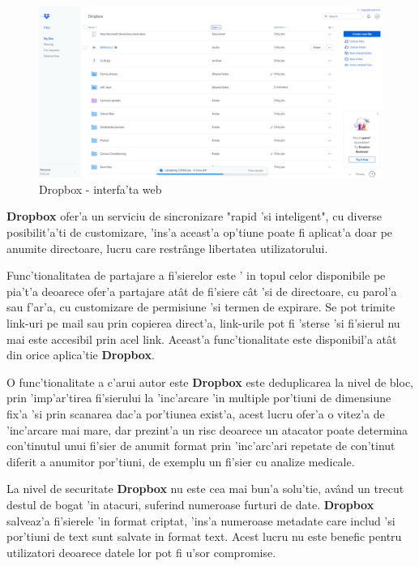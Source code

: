 \documentclass[12pt,a4paper,twoside]{report}
\begin{document}
\begin{figure}[H]
\begin{center}
\advance\leftskip-3cm
\advance\rightskip-3cm
\includegraphics[keepaspectratio=true,scale=0.6]{img/dropbox-web-app.png}
\caption{Dropbox - interfa'ta web}
\label{fig:web_Dropbox}
\end{center}
\end{figure}

\textbf{Dropbox} ofer'a un serviciu de sincronizare "rapid 'si  inteligent", cu diverse posibilit'a'ti de customizare, 'ins'a aceast'a op'tiune poate fi aplicat'a doar pe anumite directoare, lucru care restrânge libertatea utilizatorului. 

Func'tionalitatea de partajare a fi'sierelor este ' in topul celor disponibile pe pia't'a deoarece ofer'a partajare atât de fi'siere cât 'si de directoare, cu parol'a sau f'ar'a, cu customizare de permisiune 'si termen de expirare. Se pot trimite link-uri pe mail sau prin copierea direct'a, link-urile pot fi 'sterse 'si fi'sierul nu mai este accesibil prin acel link. Aceast'a func'tionalitate este disponibil'a atât din orice aplica'tie \textbf{Dropbox}.

O func'tionalitate a c'arui autor este \textbf{Dropbox} este deduplicarea la nivel de bloc, prin 'imp'ar'tirea fi'sierului la 'inc'arcare 'in multiple por'tiuni de dimensiune fix'a 'si prin scanarea dac'a por'tiunea exist'a, acest lucru ofer'a o vitez'a de 'inc'arcare mai mare, dar prezint'a un risc deoarece un atacator poate  determina con'tinutul unui fi'sier de anumit format prin 'inc'arc'ari repetate de con'tinut diferit a anumitor por'tiuni, de exemplu un fi'sier cu analize medicale.

La nivel de securitate \textbf{Dropbox} nu este cea mai bun'a solu'tie, având un trecut destul de bogat 'in atacuri, suferind numeroase furturi de date. \textbf{Dropbox} salveaz'a fi'sierele 'in format criptat, 'ins'a numeroase metadate care includ 'si por'tiuni de text sunt salvate in format text. Acest lucru nu este benefic pentru utilizatori deoarece datele lor pot fi u'sor compromise. 
\end{document}
